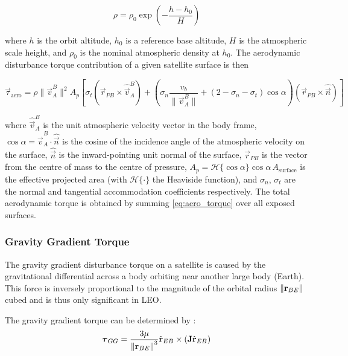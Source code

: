 \begin{equation}
    \rho = \rho_0 \exp\!\left(-\frac{h - h_0}{H}\right)
\end{equation}

where $h$ is the orbit altitude, $h_0$ is a reference base altitude, $H$ is the atmospheric scale height, and $\rho_0$ is the nominal atmospheric density at $h_0$. The aerodynamic disturbance torque contribution of a given satellite surface is then \cite{auretDesignAerodynamicAttitude2011}

\begin{equation}
    \vec{\tau}_{\text{aero}} = \rho \|\vec{v}^B_A\|^2 A_p \left[\sigma_t\left(\vec{r}_{PB} \times \hat{\vec{v}}^B_A\right) + \left(\sigma_n \frac{v_b}{\|\vec{v}^B_A\|} + (2 - \sigma_n - \sigma_t)\cos\alpha\right)\!\left(\vec{r}_{PB} \times \hat{\vec{n}}\right)\right]
    \label{eq:aero_torque}
\end{equation}

where $\hat{\vec{v}}^B_A$ is the unit atmospheric velocity vector in the body frame,$\cos\alpha = \hat{\vec{v}}^B_A \cdot \hat{\vec{n}}$ is the cosine of the incidence angle of the atmospheric velocity on the surface, $\hat{\vec{n}}$ is the inward-pointing unit normal of the surface, $\vec{r}_{PB}$ is the vector from the centre of mass to the centre of pressure, $A_p = \mathcal{H}\{\cos\alpha\}\cos\alpha\, A_{\text{surface}}$ is the effective projected area (with $\mathcal{H}\{\cdot\}$ the Heaviside function), and $\sigma_n$, $\sigma_t$ are the normal and tangential accommodation coefficients respectively. The total aerodynamic torque is obtained by summing \autoref{eq:aero_torque} over all exposed surfaces.

\subsubsection{Gravity Gradient Torque}
The gravity gradient disturbance torque \cite{wertz1999space} on a satellite is caused by the gravitational differential across a body orbiting near another large body (Earth). This force is inversely proportional to the magnitude of the orbital radius $\left\lVert \boldsymbol{\mathbf{r}}_{BE} \right\rVert$ cubed and is thus only significant in LEO.

The gravity gradient torque can be determined by \cite{wertz1999space}:
\begin{equation}
    \boldsymbol{\mathbf{\tau}}_{GG} = \frac{3\mu}{{\left\lVert \boldsymbol{\mathbf{r}}_{BE} \right\rVert}^3} \hat{\boldsymbol{\mathbf{r}}}_{EB} \times (\boldsymbol{\mathbf{J}}\hat{\boldsymbol{\mathbf{r}}}_{EB})
\end{equation}


